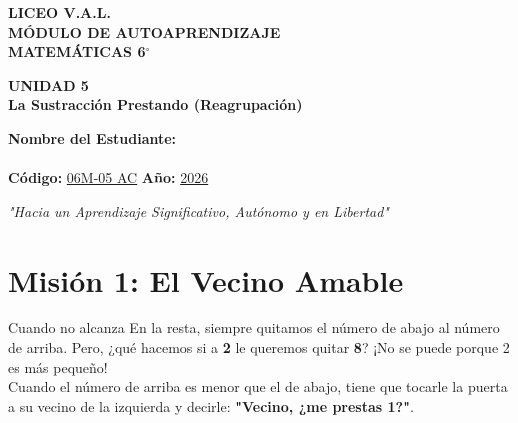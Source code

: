 \documentclass[12pt, letterpaper]{article}
\begin{document}
	
	\begin{center}
		\vspace*{1cm}
		{\Huge \textbf{LICEO V.A.L.}}\\[0.5cm]
		{\LARGE \textbf{MÓDULO DE AUTOAPRENDIZAJE}}\\[0.5cm]
		{\Large \textbf{MATEMÁTICAS 6$^\circ$}}\\[0.5cm]
		
		\begin{tcolorbox}[colback=valblue!10, colframe=valblue, arc=3mm, boxrule=1.5pt]
			\centering \Huge \textbf{UNIDAD 5}\\[0.2cm]
			\Large \textbf{La Sustracción Prestando (Reagrupación)}
		\end{tcolorbox}
		
		\vspace{0.6cm}
		\begin{tcolorbox}[colback=white, colframe=valblue, width=12cm, arc=3mm, boxrule=1.5pt]
			\centering
			\vspace{0.3cm}
			\textbf{Nombre del Estudiante:}\\[0.3cm]
			\underline{\hspace{9cm}}\\[0.5cm]
			\textbf{Código:} \underline{06M-05 AC} \hspace{1cm} \textbf{Año:} \underline{2026}
			\vspace{0.3cm}
		\end{tcolorbox}
		
		\vspace{0.8cm}
		\textit{"Hacia un Aprendizaje Significativo, Autónomo y en Libertad"}
		
	
	\end{center}
	
	
	\section*{Misión 1: El Vecino Amable}
	
	\begin{concepto}{Cuando no alcanza}
		En la resta, siempre quitamos el número de abajo al número de arriba. Pero, ¿qué hacemos si a \textbf{2} le queremos quitar \textbf{8}? ¡No se puede porque 2 es más pequeño!
		\\[0.2cm]
		Cuando el número de arriba es menor que el de abajo, tiene que tocarle la puerta a su vecino de la izquierda y decirle: \textbf{"Vecino, ¿me prestas 1?"}.
	\end{concepto}
	
\end{document}
